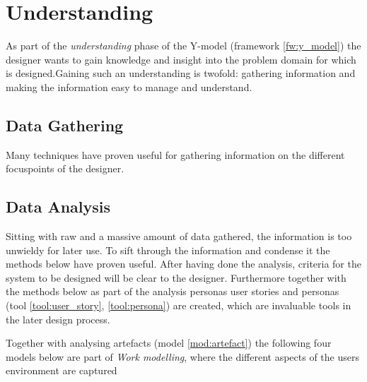 \section{Understanding} \label{sec:understanding}
As part of the \emph{understanding} phase of the Y-model (framework \ref{fw:y_model}) the designer wants to gain knowledge and insight into the problem domain for which is designed.Gaining such an understanding is twofold: gathering information and making the information easy to manage and understand.

\subsection{Data Gathering} \label{sec:data_gathering}
Many techniques have proven useful for gathering information on the different focuspoints of the designer.






\subsection{Data Analysis} \label{sec:data_analysis}
Sitting with raw and a massive amount of data gathered, the information is too unwieldy for later use. To sift through the information and condense it the methods below have proven useful. After having done the analysis, criteria for the system to be designed will be clear to the designer. Furthermore together with the methods below as part of the analysis personas user stories and personas (tool \ref{tool:user_story}, \ref{tool:persona}) are created, which are invaluable tools in the later design process.



Together with analysing artefacts (model \ref{mod:artefact}) the following four models below are part of \emph{Work modelling}, where the different aspects of the users environment are captured \cite[p. 277]{benyon_10} 





